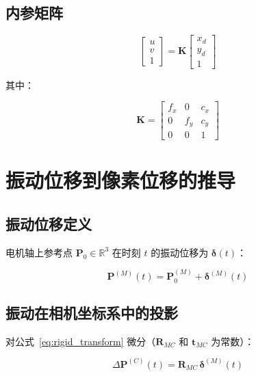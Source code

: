 \documentclass[12pt,a4paper]{article}
\begin{document}
\subsection{内参矩阵}

\begin{equation}
\begin{bmatrix} u \\ v \\ 1 \end{bmatrix}
=
\mathbf{K}
\begin{bmatrix} x_d \\ y_d \\ 1 \end{bmatrix}
\label{eq:intrinsic_matrix}
\end{equation}

其中：

\begin{equation}
\mathbf{K} =
\begin{bmatrix}
f_x & 0   & c_x \\
0   & f_y & c_y \\
0   & 0   & 1
\end{bmatrix}
\label{eq:K_matrix}
\end{equation}

\section{振动位移到像素位移的推导}

\subsection{振动位移定义}

电机轴上参考点 $\mathbf{P}_0 \in \mathbb{R}^3$ 在时刻 $t$ 的振动位移为 $\boldsymbol{\delta}(t)$：

\begin{equation}
\mathbf{P}^{(M)}(t) = \mathbf{P}_0^{(M)} + \boldsymbol{\delta}^{(M)}(t)
\label{eq:vibration_displacement}
\end{equation}

\subsection{振动在相机坐标系中的投影}

对公式~\eqref{eq:rigid_transform} 微分（$\mathbf{R}_{MC}$ 和 $\mathbf{t}_{MC}$ 为常数）：

\begin{equation}
\Delta \mathbf{P}^{(C)}(t) = \mathbf{R}_{MC} \, \boldsymbol{\delta}^{(M)}(t)
\label{eq:vibration_camera}
\end{equation}
\end{document}
